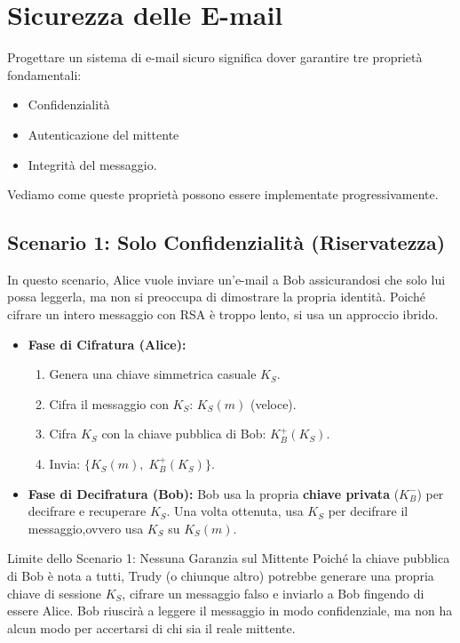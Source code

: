 \documentclass[a4paper,12pt]{report}
\newcommand{\KBp}{K_B^+} %
\begin{document}
\newpage
\section{Sicurezza delle E-mail}

Progettare un sistema di e-mail sicuro significa dover garantire tre proprietà fondamentali:
\begin{itemize}
    \item Confidenzialità
    \item Autenticazione del mittente 
    \item Integrità del messaggio. 
\end{itemize}Vediamo come queste proprietà possono essere implementate progressivamente.

\subsection{Scenario 1: Solo  Confidenzialità (Riservatezza)}
In questo scenario, Alice vuole inviare un'e-mail a Bob assicurandosi che solo lui possa leggerla, ma non si preoccupa di dimostrare la propria identità. Poiché cifrare un intero messaggio con RSA è troppo lento, si usa un approccio ibrido.

\begin{itemize}
    \item \textbf{Fase di Cifratura (Alice):} 
    
\begin{enumerate}[noitemsep]
  \item Genera una chiave simmetrica casuale $K_S$.
  \item Cifra il messaggio con $K_S$: $K_S(m)$ (veloce).
  \item Cifra $K_S$ con la chiave pubblica di Bob: $\KBp(K_S)$.
  \item Invia: $\bigl\{K_S(m),\;\KBp(K_S)\bigr\}$.
\end{enumerate}
    \item \textbf{Fase di Decifratura (Bob):} Bob usa la propria \textbf{chiave privata} ($K_B^-$) per decifrare e recuperare $K_S$. Una volta ottenuta, usa $K_S$ per decifrare il messaggio,ovvero  usa $K_S$ su $K_S(m)$.
\end{itemize}

\begin{urgentbox}{Limite dello Scenario 1: Nessuna Garanzia sul Mittente}
Poiché la chiave pubblica di Bob è nota a tutti, Trudy (o chiunque altro) potrebbe generare una propria chiave di sessione $K_S$, cifrare un messaggio falso e inviarlo a Bob fingendo di essere Alice. Bob riuscirà a leggere il messaggio in modo confidenziale, ma non ha alcun modo per accertarsi di chi sia il reale mittente.
\end{urgentbox}
\end{document}
